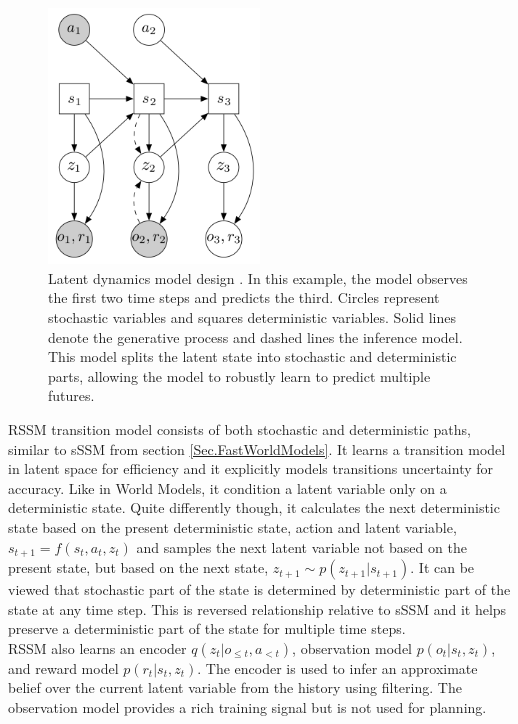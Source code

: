 \begin{figure}[H]
\includegraphics[width=0.5\textwidth,keepaspectratio]{figures/PlaNet/model.png}
\caption[PlaNet latent dynamics model design]{Latent dynamics model design \protect\cite{Algo.PlaNet}. In this example, the model observes the first two time steps and predicts the third. Circles represent stochastic variables and squares deterministic variables. Solid lines denote the generative process and dashed lines the inference model. This model splits the latent state into stochastic and deterministic parts, allowing the model to robustly learn to predict multiple futures.}
\label{Fig.PlaNetModelDesigne}
\end{figure}

RSSM transition model consists of both stochastic and deterministic paths, similar to sSSM from section \ref{Sec.FastWorldModels}. It learns a transition model in latent space for efficiency and it explicitly models transitions uncertainty for accuracy. Like in World Models, it condition a latent variable only on a deterministic state. Quite differently though, it calculates the next deterministic state based on the present deterministic state, action and latent variable, $s_{t+1} = f(s_t, a_t, z_t)$ and samples the next latent variable not based on the present state, but based on the next state, $z_{t+1} \sim p(z_{t+1}|s_{t+1})$. It can be viewed that stochastic part of the state is determined by deterministic part of the state at any time step. This is reversed relationship relative to sSSM and it helps preserve a deterministic part of the state for multiple time steps. \\
RSSM also learns an encoder $q(z_t | o_{\leqslant t}, a_{< t})$, observation model $p(o_t | s_t, z_t)$, and reward model $p(r_t | s_t, z_t)$. The encoder is used to infer an approximate belief over the current latent variable from the history using filtering. The observation model provides a rich training signal but is not used for planning.

